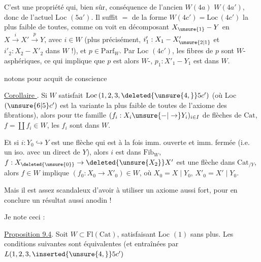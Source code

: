 C'est une propriété qui, bien sûr,  conséquence de l'ancien $W(4a)$ $W(4a')$, donc de l'actuel Loc $(5a')$. Il suffit $=$ de la forme $W(4c')=\mathrm{Loc}\,(4c')$ la plus faible de toutes, comme on voit en décomposant $X_{\unsure{1}}-Y$ en $X\xrightarrow{i}X'\xrightarrow{p}Y$, avec $i\in W$  (plus précisément, $i'_1:X_1-X'_{\unsure{2|1}}$ et $i'_2:X_2-X'_2$  dans $W$ !), et  $p\in\mathrm{Parf}_W$. Par Loc $(4c')$, les fibres de $p$ sont $W$-asphériques, ce qui implique que $p$ est alors $W$-,  $p_1:X'_1-Y_1$ est dans $W$.

 notons pour acquit de conscience

\uline{Corollaire }. Si $W$ satisfait $\mathrm{Loc}\,(1,2,3,\deleted{\unsure{4,}}5c')$ (où Loc $(\unsure{6|5}c')$ est la variante la plus faible de toutes de l'axiome des fibrations), alors  pour tte famille $(f_i:X_i\unsure{-|\to}Y_i)_{i\in I}$ de flèches de $\mathrm{Cat}$,  $f=\coprod f_i\in W$, les $f_i$ sont dans $W$.


Et si $i:Y_0\hookrightarrow Y$ est une flèche qui est à la fois imm. ouverte et imm. fermée (i.e. un iso. avec un  direct de $Y$), alors $i$ est dans $\mathrm{Fib}_W$,   $f:X_{\deleted{\unsure{0}}}\to\deleted{\unsure{X_2}}X'$ est une flèche dans $\mathrm{Cat}_{/Y}$, alors $f\in W$ implique $(f_0:X_0\to X'_0)\in W$, où $X_0=X\mid Y_0$, $X'_0=X'\mid Y_0$.

Mais il est assez scandaleux d'avoir à utiliser un axiome aussi fort, pour en conclure un résultat aussi anodin !

Je note ceci :

\uline{Proposition 9.4}. Soit $W\subset\mathrm{Fl}(\mathrm{Cat})$, satisfaisant Loc $(1)$ sans plus. Les conditions suivantes sont équivalentes (et entraînées par $L(1,2,3,\inserted{\unsure{4,}}5c')$

